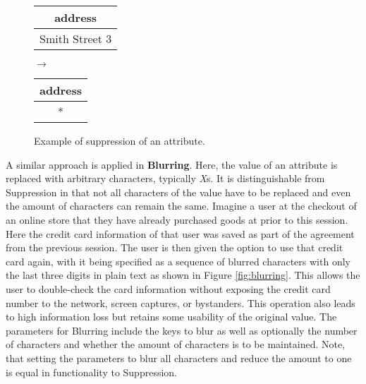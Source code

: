 \begin{figure}[ht]
    \begin{center}
    \footnotesize{
        \renewcommand{\arraystretch}{1.5}
        \begin{tabular}{|c|}
            \hline
            address \\
            \hline
            Smith Street 3 \\
            \hline
            \end{tabular}
            \quad $\longrightarrow$ \quad
            \begin{tabular}{|c|}
            \hline
            address \\
            \hline
            * \\
            \hline
        \end{tabular}
    }
    \end{center}
    \caption{Example of suppression of an attribute.\label{fig:suppression}}
\end{figure}

A similar approach is applied in \textbf{Blurring}. Here, the value of an attribute is replaced with arbitrary characters, typically \textit{X}s. It is distinguishable from Suppression in that not all characters of the value have to be replaced and even the amount of characters can remain the same. Imagine a user at the checkout of an online store that they have already purchased goods at prior to this session. Here the credit card information of that user was saved as part of the agreement from the previous session. The user is then given the option to use that credit card again, with it being specified as a sequence of blurred characters with only the last three digits in plain text as shown in Figure \ref{fig:blurring}. This allows the user to double-check the card information without exposing the credit card number to the network, screen captures, or bystanders. This operation also leads to high information loss but retains some usability of the original value. The parameters for Blurring include the keys to blur as well as optionally the number of characters and whether the amount of characters is to be maintained. Note, that setting the parameters to blur all characters and reduce the amount to one is equal in functionality to Suppression. 

\bigskip

